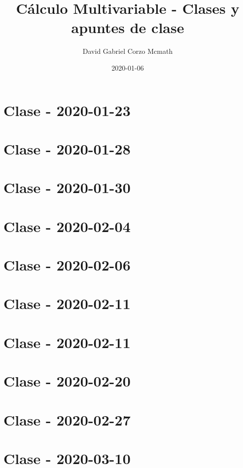 \documentclass{book}
\title{Cálculo Multivariable - Clases y apuntes de clase}
\date{2020-01-06}
\author{David Gabriel Corzo Mcmath}
\begin{document}
\maketitle
\tableofcontents
\tikzblockdefinitions




\chapter{Clase - 2020-01-23}


\chapter{Clase - 2020-01-28}


\chapter{Clase - 2020-01-30}


\chapter{Clase - 2020-02-04}


\chapter{Clase - 2020-02-06}


\chapter{Clase - 2020-02-11}


\chapter{Clase - 2020-02-11}


\chapter{Clase - 2020-02-20}


\chapter{Clase - 2020-02-27}


\chapter{Clase - 2020-03-10}

\end{document}
